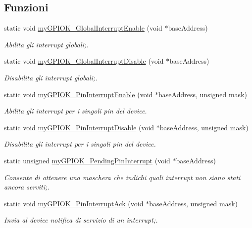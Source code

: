 \subsection*{Funzioni}
\begin{DoxyCompactItemize}
\item 
static void \hyperlink{group__ausiliarie_gabd22e9dc7675ba815f1dd8840b39b2bf}{my\+G\+P\+I\+O\+K\+\_\+\+Global\+Interrupt\+Enable} (void $\ast$base\+Address)
\begin{DoxyCompactList}\small\item\em Abilita gli interrupt globali;. \end{DoxyCompactList}\item 
static void \hyperlink{group__ausiliarie_ga941f5d329dffbf6e45cecd70bbc72b63}{my\+G\+P\+I\+O\+K\+\_\+\+Global\+Interrupt\+Disable} (void $\ast$base\+Address)
\begin{DoxyCompactList}\small\item\em Disabilita gli interrupt globali;. \end{DoxyCompactList}\item 
static void \hyperlink{group__ausiliarie_ga15ddb23be51d3e2dbb00278af7e9ce31}{my\+G\+P\+I\+O\+K\+\_\+\+Pin\+Interrupt\+Enable} (void $\ast$base\+Address, unsigned mask)
\begin{DoxyCompactList}\small\item\em Abilita gli interrupt per i singoli pin del device. \end{DoxyCompactList}\item 
static void \hyperlink{group__ausiliarie_ga57efe4a8be5e162cfd2e98f61d195087}{my\+G\+P\+I\+O\+K\+\_\+\+Pin\+Interrupt\+Disable} (void $\ast$base\+Address, unsigned mask)
\begin{DoxyCompactList}\small\item\em Disabilita gli interrupt per i singoli pin del device. \end{DoxyCompactList}\item 
static unsigned \hyperlink{group__ausiliarie_ga6019e1ca45d7a093e1e7fc546b16f773}{my\+G\+P\+I\+O\+K\+\_\+\+Pending\+Pin\+Interrupt} (void $\ast$base\+Address)
\begin{DoxyCompactList}\small\item\em Consente di ottenere una maschera che indichi quali interrupt non siano stati ancora serviti;. \end{DoxyCompactList}\item 
static void \hyperlink{group__ausiliarie_ga105156c3db48f9dd40300218e7d8e144}{my\+G\+P\+I\+O\+K\+\_\+\+Pin\+Interrupt\+Ack} (void $\ast$base\+Address, unsigned mask)
\begin{DoxyCompactList}\small\item\em Invia al device notifica di servizio di un interrupt;. \end{DoxyCompactList}\end{DoxyCompactItemize}


